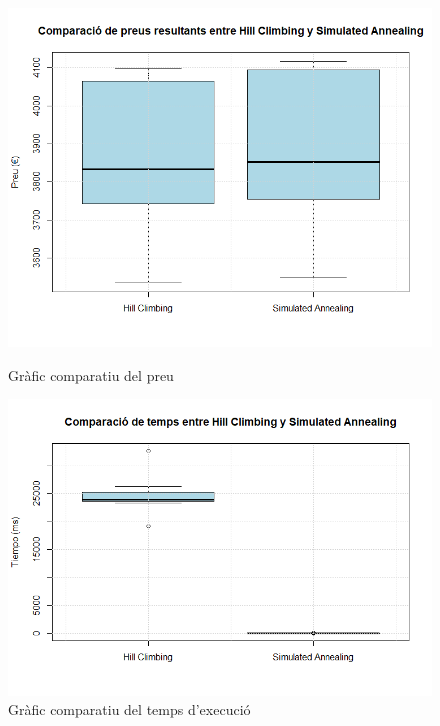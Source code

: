\documentclass[a4paper]{article}
\begin{document}
	\begin{figure}[H]
		\centering
		\begin{minipage}{0.45\textwidth}
			\centering
			\includegraphics[width=\textwidth]{images/cmpHC_SA_preu.png}
			\caption{Gràfic comparatiu del preu}
			\label{fig:cmpHC_SA_preu}
		\end{minipage} \hfill
		\begin{minipage}{0.45\textwidth}
			\centering
			\includegraphics[width=\textwidth]{images/cmpHC_SA_temps.png}
			\caption{Gràfic comparatiu del temps d'execució}
			\label{fig:cmpHC_SA_temps}
		\end{minipage}
	\end{figure}
	
\end{document}
